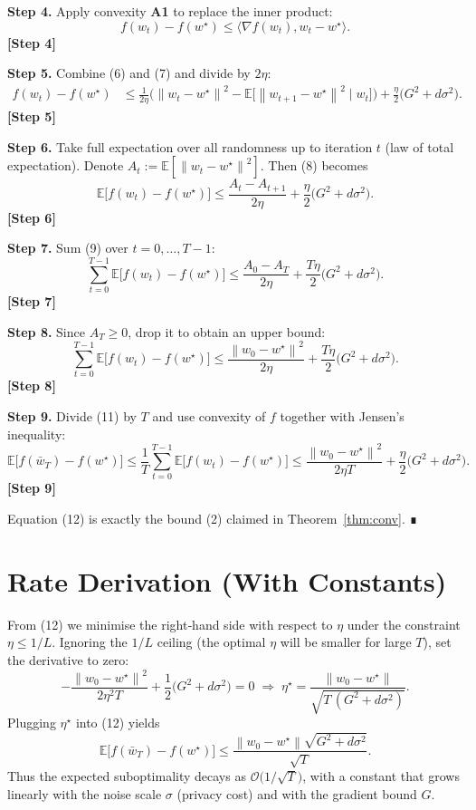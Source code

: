 \documentclass{article}
\newcommand{\E}{\mathbb{E}}
\newcommand{\norm}[1]{\left\|#1\right\|}
\newcommand{\ip}[2]{\langle #1,#2\rangle}
\newcommand{\step}[1]{\textbf{[Step #1]}}
\begin{document}
\noindent\textbf{Step 4.} Apply convexity \textbf{A1} to replace the inner product:
\[
f(w_t)-f(w^{\star})\le\ip{\nabla f(w_t)}{w_t-w^{\star}}.
\tag{7}
\]
\step{4}

\noindent\textbf{Step 5.} Combine (6) and (7) and divide by $2\eta$:
\[
\begin{aligned}
f(w_t)-f(w^{\star})
&\le \frac{1}{2\eta}\Big(
\norm{w_t-w^{\star}}^{2}
-\E\!\big[\norm{w_{t+1}-w^{\star}}^{2}\mid w_t\big]\Big)
+\frac{\eta}{2}\big(G^{2}+d\sigma^{2}\big).
\end{aligned}
\tag{8}
\]
\step{5}

\noindent\textbf{Step 6.} Take full expectation over all randomness up to iteration $t$ (law of total expectation). Denote $A_t:=\E[\norm{w_t-w^{\star}}^{2}]$. Then (8) becomes
\[
\E\!\big[f(w_t)-f(w^{\star})\big]
\le \frac{A_t-A_{t+1}}{2\eta}
+\frac{\eta}{2}\big(G^{2}+d\sigma^{2}\big).
\tag{9}
\]
\step{6}

\noindent\textbf{Step 7.} Sum (9) over $t=0,\dots,T-1$:
\[
\sum_{t=0}^{T-1}\E\!\big[f(w_t)-f(w^{\star})\big]
\le \frac{A_0-A_T}{2\eta}
+ \frac{T\eta}{2}\big(G^{2}+d\sigma^{2}\big).
\tag{10}
\]
\step{7}

\noindent\textbf{Step 8.} Since $A_T\ge0$, drop it to obtain an upper bound:
\[
\sum_{t=0}^{T-1}\E\!\big[f(w_t)-f(w^{\star})\big]
\le \frac{\norm{w_0-w^{\star}}^{2}}{2\eta}
+ \frac{T\eta}{2}\big(G^{2}+d\sigma^{2}\big).
\tag{11}
\]
\step{8}

\noindent\textbf{Step 9.} Divide (11) by $T$ and use convexity of $f$ together with Jensen’s inequality:
\[
\E\!\big[f(\bar w_T)-f(w^{\star})\big]
\le \frac{1}{T}\sum_{t=0}^{T-1}\E\!\big[f(w_t)-f(w^{\star})\big]
\le \frac{\norm{w_0-w^{\star}}^{2}}{2\eta T}
+\frac{\eta}{2}\big(G^{2}+d\sigma^{2}\big).
\tag{12}
\]
\step{9}

Equation (12) is exactly the bound (2) claimed in Theorem~\ref{thm:conv}. ∎

\section*{Rate Derivation (With Constants)}
From (12) we minimise the right‑hand side with respect to $\eta$ under the constraint $\eta\le 1/L$. Ignoring the $1/L$ ceiling (the optimal $\eta$ will be smaller for large $T$), set the derivative to zero:
\[
-\frac{\norm{w_0-w^{\star}}^{2}}{2\eta^{2}T}
+\frac{1}{2}\big(G^{2}+d\sigma^{2}\big)=0
\;\Longrightarrow\;
\eta^{\star}= \frac{\norm{w_0-w^{\star}}}{\sqrt{T\,(G^{2}+d\sigma^{2})}}.
\tag{13}
\]
Plugging $\eta^{\star}$ into (12) yields
\[
\E\!\big[f(\bar w_T)-f(w^{\star})\big]
\le
\frac{\norm{w_0-w^{\star}}\sqrt{G^{2}+d\sigma^{2}}}{\sqrt{T}}.
\tag{14}
\]
Thus the expected suboptimality decays as $\mathcal{O}\!\big(1/\sqrt{T}\big)$, with a constant that grows linearly with the noise scale $\sigma$ (privacy cost) and with the gradient bound $G$.
\end{document}
